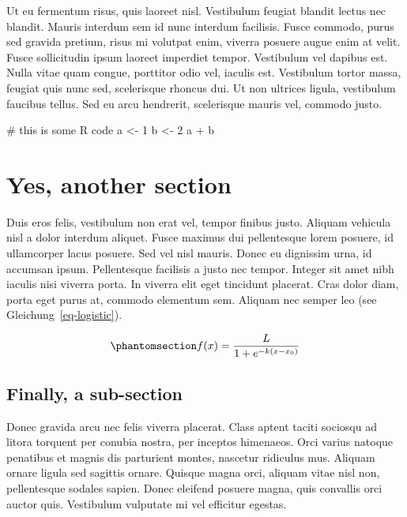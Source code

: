 \documentclass[
  12pt,
  a4paperpaper,
  a4paper]{scrreprt}
\newenvironment{Shaded}{\begin{snugshade}}{\end{snugshade}}
\newcommand{\CommentTok}[1]{\textcolor[rgb]{0.37,0.37,0.37}{#1}}
\newcommand{\DecValTok}[1]{\textcolor[rgb]{0.68,0.00,0.00}{#1}}
\newcommand{\NormalTok}[1]{\textcolor[rgb]{0.00,0.23,0.31}{#1}}
\newcommand{\OtherTok}[1]{\textcolor[rgb]{0.00,0.23,0.31}{#1}}
\newcommand{\SpecialCharTok}[1]{\textcolor[rgb]{0.37,0.37,0.37}{#1}}
\begin{document}
Ut eu fermentum risus, quis laoreet nisl. Vestibulum feugiat blandit
lectus nec blandit. Mauris interdum sem id nunc interdum facilisis.
Fusce commodo, purus sed gravida pretium, risus mi volutpat enim,
viverra posuere augue enim at velit. Fusce sollicitudin ipsum laoreet
imperdiet tempor. Vestibulum vel dapibus est. Nulla vitae quam congue,
porttitor odio vel, iaculis est. Vestibulum tortor massa, feugiat quis
nunc sed, scelerisque rhoncus dui. Ut non ultrices ligula, vestibulum
faucibus tellus. Sed eu arcu hendrerit, scelerisque mauris vel, commodo
justo.

\begin{Shaded}
\begin{Highlighting}[]
\CommentTok{\# this is some R code}
\NormalTok{a }\OtherTok{\textless{}{-}} \DecValTok{1}
\NormalTok{b }\OtherTok{\textless{}{-}} \DecValTok{2}
\NormalTok{a }\SpecialCharTok{+}\NormalTok{ b}
\end{Highlighting}
\end{Shaded}

\section{Yes, another section}\label{yes-another-section}

Duis eros felis, vestibulum non erat vel, tempor finibus justo. Aliquam
vehicula nisl a dolor interdum aliquet. Fusce maximus dui pellentesque
lorem posuere, id ullamcorper lacus posuere. Sed vel nisl mauris. Donec
eu dignissim urna, id accumsan ipsum. Pellentesque facilisis a justo nec
tempor. Integer sit amet nibh iaculis nisi viverra porta. In viverra
elit eget tincidunt placerat. Cras dolor diam, porta eget purus at,
commodo elementum sem. Aliquam nec semper leo (see
Gleichung~\ref{eq-logistic}).

\begin{equation}\phantomsection\label{eq-logistic}{
f(x)={\frac {L}{1+e^{-k(x-x_{0})}}}
}\end{equation}

\subsection{Finally, a sub-section}\label{finally-a-sub-section}

Donec gravida arcu nec felis viverra placerat. Class aptent taciti
sociosqu ad litora torquent per conubia nostra, per inceptos himenaeos.
Orci varius natoque penatibus et magnis dis parturient montes, nascetur
ridiculus mus. Aliquam ornare ligula sed sagittis ornare. Quisque magna
orci, aliquam vitae nisl non, pellentesque sodales sapien. Donec
eleifend posuere magna, quis convallis orci auctor quis. Vestibulum
vulputate mi vel efficitur egestas.
\end{document}
